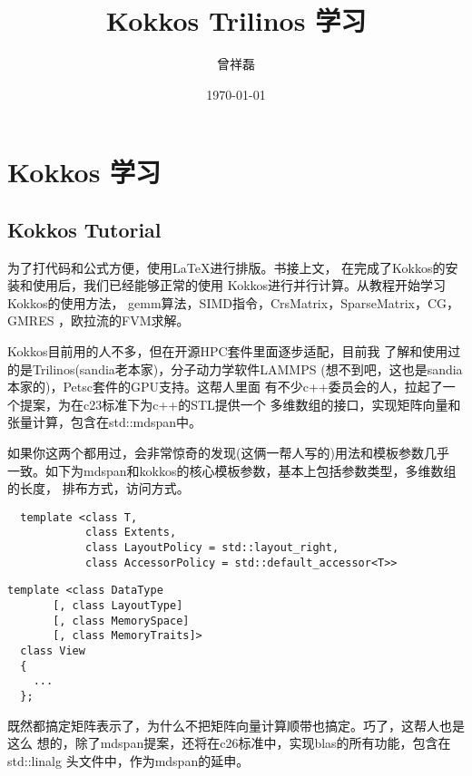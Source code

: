 \documentclass[11pt, a4paper]{ctexart}
\title{Kokkos Trilinos 学习}
\author{曾祥磊}
\date{\today}
\theoremstyle{definition}
\theoremstyle{plain}
\begin{document}
\maketitle
\tableofcontents

\newpage
\section{Kokkos 学习}
\subsection{Kokkos Tutorial}

为了打代码和公式方便，使用\LaTeX 进行排版。书接上文，
在完成了Kokkos的安装和使用后，我们已经能够正常的使用
Kokkos进行并行计算。从教程开始学习Kokkos的使用方法，
gemm算法，SIMD指令，CrsMatrix，SparseMatrix，CG，GMRES
，欧拉流的FVM求解。

Kokkos目前用的人不多，但在开源HPC套件里面逐步适配，目前我
了解和使用过的是Trilinos(sandia老本家)，分子动力学软件LAMMPS
(想不到吧，这也是sandia本家的)，Petsc套件的GPU支持。这帮人里面
有不少c++委员会的人，拉起了一个提案，为在c23标准下为c++的STL提供一个
多维数组的接口，实现矩阵向量和张量计算，包含在std::mdspan中。

如果你这两个都用过，会非常惊奇的发现(这俩一帮人写的)用法和模板参数几乎
一致。如下为mdspan和kokkos的核心模板参数，基本上包括参数类型，多维数组的长度，
排布方式，访问方式。

\begin{lstlisting}
  template <class T,
            class Extents,
            class LayoutPolicy = std::layout_right, 
            class AccessorPolicy = std::default_accessor<T>> 
\end{lstlisting}

\begin{lstlisting}
template <class DataType 
       [, class LayoutType] 
       [, class MemorySpace] 
       [, class MemoryTraits]>
  class View
  {
    ...
  };
\end{lstlisting}

既然都搞定矩阵表示了，为什么不把矩阵向量计算顺带也搞定。巧了，这帮人也是这么
想的，除了mdspan提案，还将在c26标准中，实现blas的所有功能，包含在std::linalg
头文件中，作为mdspan的延申。








\end{document}
